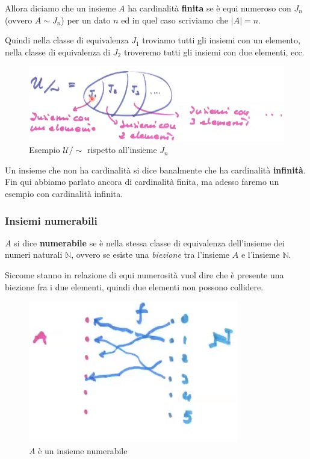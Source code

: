 \documentclass{article}
\begin{document}
Allora diciamo che un insieme $A$ ha cardinalità \textbf{finita} se è equi
numeroso con $J_n$ (ovvero $A\sim J_n$) per un dato $n$ ed in quel caso scriviamo che $|A|=n$.

Quindi nella classe di equivalenza $J_1$ troviamo tutti gli insiemi con un
elemento, nella classe di equivalenza di $J_2$ troveremo tutti gli insiemi con due elementi, ecc.
\begin{figure}[H]
    \centering
    \includegraphics[scale=0.5]{images/U_insiemi_esemp_card2.png}
    \caption{Esempio $\mathcal{U}/\sim$ rispetto all'insieme $J_n$}
\end{figure}
Un insieme che non ha cardinalità si dice banalmente che ha cardinalità \textbf{infinità}. Fin qui abbiamo
parlato ancora di cardinalità finita, ma adesso faremo un esempio con cardinalità infinita.

\subsubsection{Insiemi numerabili}
$A$ si dice \textbf{numerabile} se è nella stessa classe di equivalenza dell'insieme dei numeri naturali
$\mathbb{N}$, ovvero se esiste una \textit{biezione} tra l'insieme $A$ e l'insieme $\mathbb{N}$.

Siccome stanno in relazione di equi numerosità
vuol dire che è presente una biezione fra i due elementi, quindi due elementi non possono collidere.

\begin{figure}[H]
    \centering
    \includegraphics[scale=0.6]{images/A_numerabile_N.png}
    \caption{$A$ è un insieme numerabile}
\end{figure}
\end{document}
